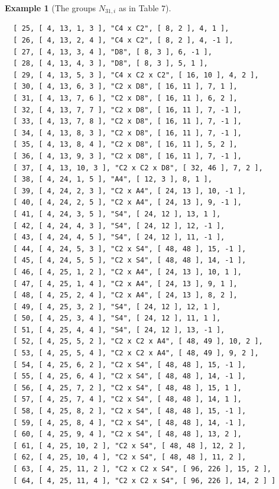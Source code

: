 \documentclass{amsart}
\theoremstyle{plain}
\theoremstyle{definition}
\newtheorem{example}[theorem]{Example}
\theoremstyle{remark}
\begin{document}
\begin{example}[The groups $N_{31,i}$ as in Table $7$]
\begin{verbatim}
  [ 25, [ 4, 13, 1, 3 ], "C4 x C2", [ 8, 2 ], 4, 1 ], 
  [ 26, [ 4, 13, 2, 4 ], "C4 x C2", [ 8, 2 ], 4, -1 ], 
  [ 27, [ 4, 13, 3, 4 ], "D8", [ 8, 3 ], 6, -1 ], 
  [ 28, [ 4, 13, 4, 3 ], "D8", [ 8, 3 ], 5, 1 ], 
  [ 29, [ 4, 13, 5, 3 ], "C4 x C2 x C2", [ 16, 10 ], 4, 2 ], 
  [ 30, [ 4, 13, 6, 3 ], "C2 x D8", [ 16, 11 ], 7, 1 ], 
  [ 31, [ 4, 13, 7, 6 ], "C2 x D8", [ 16, 11 ], 6, 2 ], 
  [ 32, [ 4, 13, 7, 7 ], "C2 x D8", [ 16, 11 ], 7, -1 ], 
  [ 33, [ 4, 13, 7, 8 ], "C2 x D8", [ 16, 11 ], 7, -1 ], 
  [ 34, [ 4, 13, 8, 3 ], "C2 x D8", [ 16, 11 ], 7, -1 ], 
  [ 35, [ 4, 13, 8, 4 ], "C2 x D8", [ 16, 11 ], 5, 2 ], 
  [ 36, [ 4, 13, 9, 3 ], "C2 x D8", [ 16, 11 ], 7, -1 ], 
  [ 37, [ 4, 13, 10, 3 ], "C2 x C2 x D8", [ 32, 46 ], 7, 2 ], 
  [ 38, [ 4, 24, 1, 5 ], "A4", [ 12, 3 ], 8, 1 ], 
  [ 39, [ 4, 24, 2, 3 ], "C2 x A4", [ 24, 13 ], 10, -1 ], 
  [ 40, [ 4, 24, 2, 5 ], "C2 x A4", [ 24, 13 ], 9, -1 ], 
  [ 41, [ 4, 24, 3, 5 ], "S4", [ 24, 12 ], 13, 1 ], 
  [ 42, [ 4, 24, 4, 3 ], "S4", [ 24, 12 ], 12, -1 ], 
  [ 43, [ 4, 24, 4, 5 ], "S4", [ 24, 12 ], 11, -1 ], 
  [ 44, [ 4, 24, 5, 3 ], "C2 x S4", [ 48, 48 ], 15, -1 ], 
  [ 45, [ 4, 24, 5, 5 ], "C2 x S4", [ 48, 48 ], 14, -1 ], 
  [ 46, [ 4, 25, 1, 2 ], "C2 x A4", [ 24, 13 ], 10, 1 ], 
  [ 47, [ 4, 25, 1, 4 ], "C2 x A4", [ 24, 13 ], 9, 1 ], 
  [ 48, [ 4, 25, 2, 4 ], "C2 x A4", [ 24, 13 ], 8, 2 ], 
  [ 49, [ 4, 25, 3, 2 ], "S4", [ 24, 12 ], 12, 1 ], 
  [ 50, [ 4, 25, 3, 4 ], "S4", [ 24, 12 ], 11, 1 ], 
  [ 51, [ 4, 25, 4, 4 ], "S4", [ 24, 12 ], 13, -1 ], 
  [ 52, [ 4, 25, 5, 2 ], "C2 x C2 x A4", [ 48, 49 ], 10, 2 ], 
  [ 53, [ 4, 25, 5, 4 ], "C2 x C2 x A4", [ 48, 49 ], 9, 2 ], 
  [ 54, [ 4, 25, 6, 2 ], "C2 x S4", [ 48, 48 ], 15, -1 ], 
  [ 55, [ 4, 25, 6, 4 ], "C2 x S4", [ 48, 48 ], 14, -1 ], 
  [ 56, [ 4, 25, 7, 2 ], "C2 x S4", [ 48, 48 ], 15, 1 ], 
  [ 57, [ 4, 25, 7, 4 ], "C2 x S4", [ 48, 48 ], 14, 1 ], 
  [ 58, [ 4, 25, 8, 2 ], "C2 x S4", [ 48, 48 ], 15, -1 ], 
  [ 59, [ 4, 25, 8, 4 ], "C2 x S4", [ 48, 48 ], 14, -1 ], 
  [ 60, [ 4, 25, 9, 4 ], "C2 x S4", [ 48, 48 ], 13, 2 ], 
  [ 61, [ 4, 25, 10, 2 ], "C2 x S4", [ 48, 48 ], 12, 2 ], 
  [ 62, [ 4, 25, 10, 4 ], "C2 x S4", [ 48, 48 ], 11, 2 ], 
  [ 63, [ 4, 25, 11, 2 ], "C2 x C2 x S4", [ 96, 226 ], 15, 2 ], 
  [ 64, [ 4, 25, 11, 4 ], "C2 x C2 x S4", [ 96, 226 ], 14, 2 ] ]
\end{verbatim}
\end{example}
\end{document}
